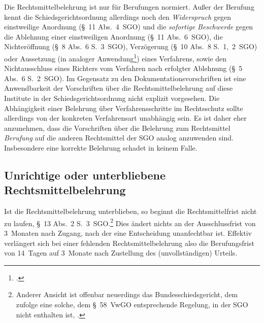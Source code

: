 Die Rechtsmittelbelehrung ist nur für Berufungen normiert.
Außer der Berufung kennt die Schiedsgerichtsordnung allerdings noch den \emph{Widerspruch} gegen einstweilige Anordnung (\S~11 Abs.~4~SGO) und die \emph{sofortige Beschwerde} gegen die Ablehnung einer einstweiligen Anordnung (\S~11 Abs.~6~SGO), die Nichteröffnung (\S~8 Abs.~6 S.~3~SGO), Verzögerung (\S~10 Abs.~8 S.~1,~2~SGO) oder Aussetzung (in analoger Anwendung\footnote{\cite{BSGPP100222152}.}) eines Verfahrens, sowie den Nichtausschluss eines Richters vom Verfahren nach erfolgter Ablehnung (\S~5 Abs.~6 S.~2~SGO).
Im Gegensatz zu den Dokumentationsvorschriften ist eine Anwendbarkeit der Vorschriften über die Rechtsmittelbelehrung auf diese Institute in der Schiedsgerichtsordnung nicht explizit vorgesehen.
Die Abhängigkeit einer Belehrung über Verfahrensschritte im Rechtsschutz sollte allerdings von der konkreten Verfahrensart unabhängig sein.
Es ist daher eher anzunehmen, dass die Vorschriften über die Belehrung zum Rechtsmittel \emph{Berufung} auf die anderen Rechtsmittel der SGO analog anzuwenden sind.
Insbesondere eine korrekte Belehrung schadet in keinem Falle.

\subsection{Unrichtige oder unterbliebene Rechtsmittelbelehrung}
\label{Urteilsaufbau:Rechtsmittelbelehrung:Falsch}
Ist die Rechtsmittelbelehrung unterblieben, so beginnt die Rechtsmittelfrist nicht zu laufen, \S~13 Abs.~2 S.~3~SGO.\footnote{Anderer Ansicht ist offenbar neuerdings das Bundesschiedsgericht, dem zufolge eine solche, dem \S~58~VwGO entsprechende Regelung, in der SGO nicht enthalten ist, \cite{BSGPP100132493}.}
Dies ändert nichts an der Ausschlussfrist von 3~Monaten nach Zugang, nach der eine Entscheidung unanfechtbar ist.
Effektiv verlängert sich bei einer fehlenden Rechtsmittelbelehrung also die Berufungsfrist von 14~Tagen auf 3~Monate nach Zustellung des (unvollständigen) Urteils.

